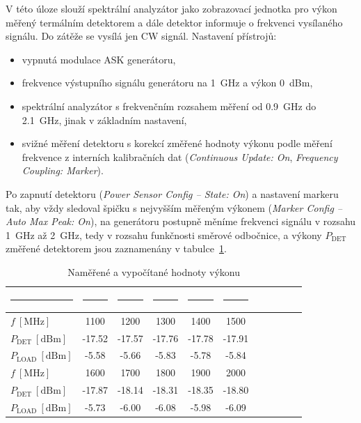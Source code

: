 \documentclass[11pt,a4paper]{article}
\begin{document}
V této úloze slouží spektrální analyzátor jako zobrazovací jednotka pro výkon měřený termálním detektorem a dále detektor informuje o frekvenci vysílaného signálu. Do zátěže se vysílá jen CW signál. Nastavení přístrojů:
\begin{itemize}
    \item vypnutá modulace ASK generátoru,
    \item frekvence výstupního signálu generátoru na 1~GHz a výkon 0~dBm,
    \item spektrální analyzátor s frekvenčním rozsahem měření od 0.9~GHz do 2.1~GHz, jinak v základním nastavení,
    \item svižné měření detektoru s korekcí změřené hodnoty výkonu podle měření frekvence z interních kalibračních dat (\emph{Continuous Update: On}, \emph{Frequency Coupling: Marker}).
\end{itemize}
Po zapnutí detektoru (\emph{Power Sensor Config -- State: On}) a nastavení markeru tak, aby vždy sledoval špičku s nejvyšším měřeným výkonem (\emph{Marker Config -- Auto Max Peak: On}), na generátoru postupně měníme frekvenci signálu v rozsahu 1~GHz až 2~GHz, tedy v rozsahu funkčnosti směrové odbočnice, a výkony $P_{\mathrm{DET}}$ změřené detektorem jsou zaznamenány v tabulce~\ref{table:task2-data}.
\begin{table}[!ht]
    \centering
    \begin{tabular}{|l||c|c|c|c|c|c|c|c|c|c|}
        \rule{2cm}{0pt} & \rule{1.5cm}{0pt} & \rule{1.5cm}{0pt} & \rule{1.5cm}{0pt} & \rule{1.5cm}{0pt} & \rule{1.5cm}{0pt}\\[-\arraystretch\normalbaselineskip]
        \hline
        $f\ [\mathrm{MHz}]$ & 1100 & 1200 & 1300 & 1400 & 1500\\
        \hline
        $P_{\mathrm{DET}} \ [\mathrm{dBm}]$ & -17.52 & -17.57 & -17.76 & -17.78 & -17.91\\
        \hline
        $P_{\mathrm{LOAD}} \ [\mathrm{dBm}]$ & -5.58 & -5.66 & -5.83 & -5.78 & -5.84\\
        \hline\hline
        $f\ [\mathrm{MHz}]$ & 1600 & 1700 & 1800 & 1900 & 2000\\
        \hline
        $P_{\mathrm{DET}} \ [\mathrm{dBm}]$ & -17.87 & -18.14 & -18.31 & -18.35 & -18.80\\
        \hline
        $P_{\mathrm{LOAD}} \ [\mathrm{dBm}]$ & -5.73 & -6.00 & -6.08 & -5.98 & -6.09\\
        \hline
    \end{tabular}
    \caption{\label{table:task2-data}Naměřené a vypočítané hodnoty výkonu}
\end{table}
\end{document}
